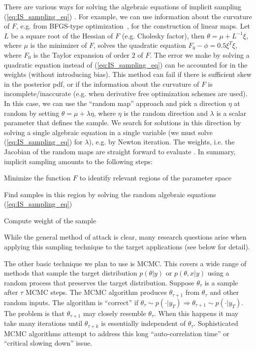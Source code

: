 \documentclass[11pt]{article}
\newcommand{\MarginPar}[1]{\marginpar{%
\vskip-\baselineskip %
\raggedright\tiny\sffamily
\hrule\smallskip{\color{red}#1}\par\smallskip\hrule}}
\begin{document}
There are various ways for solving the algebraic equations of implicit sampling (\ref{eq:IS_sampling_eq}) \cite{chorin2010,Morzfeld2011}. 
For example, we can use information about the curvature of $F$, e.g. from BFGS-type optimization~\cite{Liu:1989:LMB:81100.83726}, for the construction of linear maps. Let $L$ be a square root of the Hessian of $F$ (e.g. Cholesky factor), then $\theta = \mu +L^{-1}\xi$, where $\mu$ is the minimizer of $F$, solves the quadratic equation $F_0-\phi=0.5\xi^T\xi$, where $F_0$ is the Taylor expansion of order $2$ of $F$. 
The error we make by solving a quadratic equation instead of (\ref{eq:IS_sampling_eq}) can be accounted for in the weights (without introducing bias). This method can fail if there is sufficient skew in the posterior pdf, or if the information about the curvature of $F$ is incomplete/inaccurate (e.g. when derivative free optimization schemes are used). In this case, we can use the ``random map'' approach and pick a direction $\eta$ at random by setting $\theta = \mu+\lambda \eta$, where $\eta$ is the random direction and $\lambda$ is a scalar parameter that defines the sample. We search for solutions in this direction by solving a single algebraic equation in a single variable (we must solve (\ref{eq:IS_sampling_eq}) for $\lambda$), e.g. by Newton iteration. The weights, i.e. the Jacobian of the random maps are straight forward to evaluate \cite{Morzfeld2011}. In summary, implicit sampling amounts to the following steps:
\begin{compactenum}
	\item Minimize the function $F$ to identify relevant regions of the parameter space
	\item Find samples in this region by solving the random algebraic equations (\ref{eq:IS_sampling_eq})\
        \item Compute weight of the sample
\end{compactenum}
While the general method of attack is clear, many research questions arise when applying this sampling technique to the target applications (see below for detail).

The other basic technique we plan to use is MCMC.
This covers a wide range of methods that sample the target distribution $p(\theta|y)$ or $p(\theta,x|y)$ 
using a random process that preserves the target distribution.
Suppose $\theta_{\tau}$ is a sample after $\tau$ MCMC steps.
The MCMC algorithm produces $\theta_{\tau+1}$ from $\theta_{\tau}$ and other random inputs.
The algorithm is ``correct'' if 
$\theta_{\tau} \sim p(\cdot|y_T) \Rightarrow \theta_{\tau+1} \sim p(\cdot|y_T)$.
The problem is that $\theta_{\tau+1}$ may closely resemble $\theta_{\tau}$.
When this happens it may take many iterations until $\theta_{\tau + k}$ is essentially 
independent of $\theta_{\tau}$.
Sophisticated MCMC algorithms attempt to address this long ``auto-correlation time'' or ``critical
slowing down'' issue.
\end{document}
